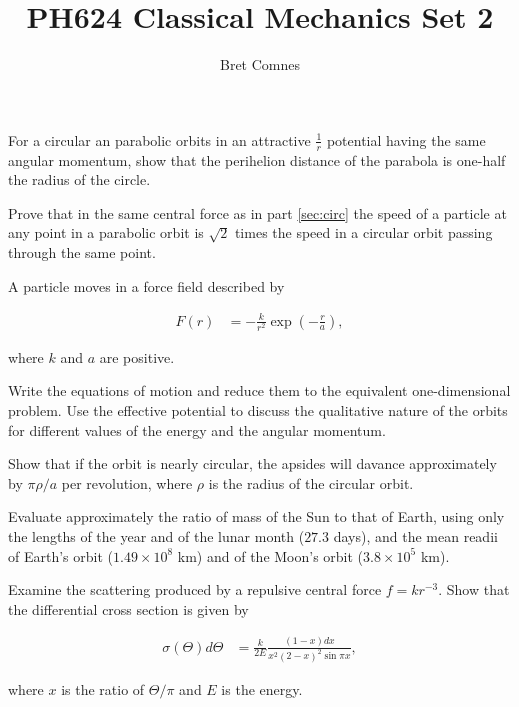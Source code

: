 \documentclass{bachw}
\author{Bret Comnes}
\title{PH624 Classical Mechanics Set 2}
\begin{document}

\subproblem{}
\label{sec:circ}
For a circular an parabolic orbits in an attractive $\frac{1}{r}$ potential having the same angular momentum, show that the perihelion distance of the parabola is one-half the radius of the circle.

\solution{}

\subproblem{}
Prove that in the same central force as in part \ref{sec:circ} the speed of a particle at any point in a parabolic orbit is $\sqrt{2}$ times the speed in a circular orbit passing through the same point.
 
\solution{}


A particle moves in a force field described by

\begin{align}
	F(r) &= -\frac{k}{r^2} \exp{\left(-
  \frac{r}{a}
  \right)},
\end{align}

where $k$ and $a$ are positive.

\subproblem{}
Write the equations of motion and reduce them to the equivalent one-dimensional problem.  Use the effective potential to discuss the qualitative nature of the orbits for different values of the energy and the angular momentum.

\solution{}

\subproblem{}
Show that if the orbit is nearly circular, the apsides will davance approximately by $\pi \rho / a$ per revolution, where $\rho$ is the radius of the circular orbit.

\solution{}

Evaluate approximately the ratio of mass of the Sun to that of Earth, using only the lengths of the year and of the lunar month ($27.3$ days), and the mean readii of Earth's orbit ($1.49 \times 10^8$ km) and of the Moon's orbit ($3.8 \times 10^5$ km).

\solution{}

Examine the scattering produced by a repulsive central force $ f = k r^{-3}$.  Show that the differential cross section is given by

\begin{align}
  \sigma(\Theta)d{\Theta} &= 
  \frac
    {k}
    {2E} 
  \frac
    {(1 - x) dx}
    {x^2 (2 - x)^2 \sin{\pi x}},
\end{align}

where $x$ is the ratio of $\Theta / \pi$ and $E$ is the energy.
\end{document}
